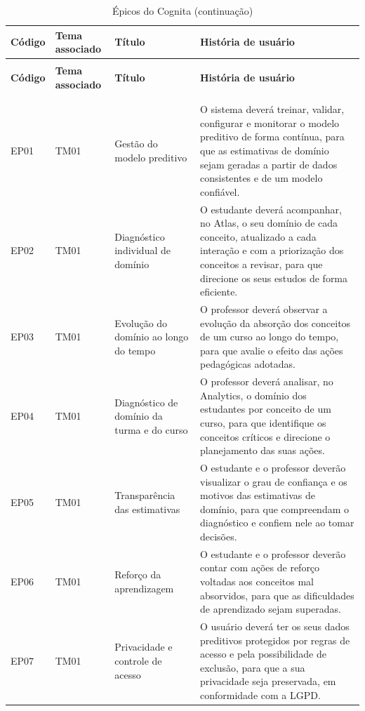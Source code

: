 {\small
\begin{longtable}{>{\raggedright\arraybackslash}p{1.4cm}>{\raggedright\arraybackslash}p{2.0cm}>{\raggedright\arraybackslash}p{3.4cm}>{\raggedright\arraybackslash}p{7.0cm}}
\caption{Épicos do Cognita}
\label{tab:epicos} \\
\hline
\textbf{Código} & \textbf{Tema associado} & \textbf{Título} & \textbf{História de usuário} \\
\hline
\endfirsthead
\caption[]{Épicos do Cognita (continuação)} \\
\hline
\textbf{Código} & \textbf{Tema associado} & \textbf{Título} & \textbf{História de usuário} \\
\hline
\endhead
\hline
\multicolumn{4}{r}{\textit{Continua na próxima página}} \\
\endfoot
\hline
\multicolumn{4}{l}{Fonte: Elaborado pelos autores.} \\
\endlastfoot
EP01 & TM01 & Gestão do modelo preditivo & O sistema deverá treinar, validar, configurar e monitorar o modelo preditivo de forma contínua, para que as estimativas de domínio sejam geradas a partir de dados consistentes e de um modelo confiável. \\
\hline
EP02 & TM01 & Diagnóstico individual de domínio & O estudante deverá acompanhar, no Atlas, o seu domínio de cada conceito, atualizado a cada interação e com a priorização dos conceitos a revisar, para que direcione os seus estudos de forma eficiente. \\
\hline
EP03 & TM01 & Evolução do domínio ao longo do tempo & O professor deverá observar a evolução da absorção dos conceitos de um curso ao longo do tempo, para que avalie o efeito das ações pedagógicas adotadas. \\
\hline
EP04 & TM01 & Diagnóstico de domínio da turma e do curso & O professor deverá analisar, no Analytics, o domínio dos estudantes por conceito de um curso, para que identifique os conceitos críticos e direcione o planejamento das suas ações. \\
\hline
EP05 & TM01 & Transparência das estimativas & O estudante e o professor deverão visualizar o grau de confiança e os motivos das estimativas de domínio, para que compreendam o diagnóstico e confiem nele ao tomar decisões. \\
\hline
EP06 & TM01 & Reforço da aprendizagem & O estudante e o professor deverão contar com ações de reforço voltadas aos conceitos mal absorvidos, para que as dificuldades de aprendizado sejam superadas. \\
\hline
EP07 & TM01 & Privacidade e controle de acesso & O usuário deverá ter os seus dados preditivos protegidos por regras de acesso e pela possibilidade de exclusão, para que a sua privacidade seja preservada, em conformidade com a LGPD. \\
\hline
\end{longtable}
}

